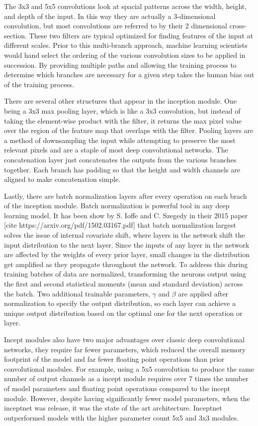 The 3x3 and 5x5 convolutions look at spacial patterns across the width, height, and depth of the input. In this way they are actually a 3-dimensional convolution, but most convolutions are referred to by their 2 dimensional cross-section. These two filters are typical optimized for finding features of the input at different scales. Prior to this multi-branch approach, machine learning scientists would hand select the ordering of the various convolution sizes to be applied in succession. By providing multiple paths and allowing the training process to determine which branches are necessary for a given step takes the human bias out of the training process.

There are several other structures that appear in the inception module. One being a 3x3 max pooling layer, which is like a 3x3 convolution, but instead of taking the element-wise product with the filter, it returns the max pixel value over the region of the feature map that overlaps with the filter. Pooling layers are a method of downsampling the input while attempting to preserve the most relevant pixels and are a staple of most deep convolutional networks. The concatenation layer just concatenates the outputs from the various branches together. Each branch has padding so that the height and width channels are aligned to make concatenation simple.

Lastly, there are batch normalization layers after every operation on each brach of the inception module. Batch normalization is powerful tool in any deep learning model. It has been show by S. Ioffe and C. Szegedy in their 2015 paper [cite https://arxiv.org/pdf/1502.03167.pdf] that batch normalization largest solves the issue of internal covariate shift, where layers in the network shift the input distribution to the next layer. Since the inputs of any layer in the network are affected by the weights of every prior layer, small changes in the distribution get amplified as they propagate throughout the network. To address this during training batches of data are normalized, transforming the neurons output using the first and second statistical moments (mean and standard deviation) across the batch. Two additional trainable parameters, $\gamma$ and $\beta$ are applied after normalization to specify the output distribution, so each layer can achieve a unique output distribution based on the optimal one for the next operation or layer.

Incept modules also have two major advantages over classic deep convolutional networks, they require far fewer parameters, which reduced the overall memory footprint of the model and far fewer floating point operations than prior convolutional modules. For example, using a 5x5 convolution to produce the same number of output channels as a incept module requires over 7 times the number of model parameters and floating point operations compared to the incept module. However, despite having significantly fewer model parameters, when the inceptnet was release, it was the state of the art architecture. Inceptnet outperformed models with the higher parameter count 5x5 and 3x3 modules.

